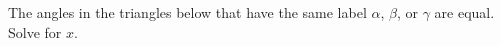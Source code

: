 The angles in the triangles below that have the same label $\alpha$, $\beta$, or $\gamma$ are equal. Solve for $x$.
